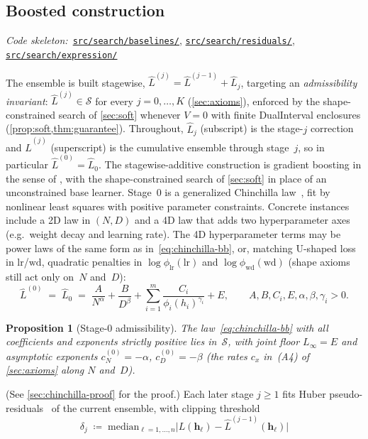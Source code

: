 \documentclass[11pt]{article}
\newcommand{\calS}{\mathcal{S}}
\newcommand{\Lhat}{\hat{L}}
\newcommand{\repoTree}{https://github.com/krichelj/ByteBoost-Shape-Constrained-Boosted-SR/tree/main/}
\newcommand{\pyDir}[1]{\href{\repoTree#1}{\nolinkurl{#1/}}}
\newcommand{\codeRef}[1]{%
  \par\nobreak\noindent
  {\footnotesize\textit{Code skeleton:}~#1}\par\smallskip}
\theoremstyle{plain}
\newtheorem{proposition}{Proposition}
\theoremstyle{remark}
\begin{document}
\subsection{Boosted construction}\label{sec:boosting}
\codeRef{\pyDir{src/search/baselines}, \pyDir{src/search/residuals}, \pyDir{src/search/expression}}
The ensemble is built stagewise,
$\Lhat^{(j)} = \Lhat^{(j-1)} + \Lhat_j$, targeting an \emph{admissibility invariant}:
$\Lhat^{(j)} \in \calS$ for every $j = 0, \ldots, K$ (\cref{sec:axioms}),
enforced by the shape-constrained search of \cref{sec:soft} whenever $V=0$ with finite DualInterval enclosures (\cref{prop:soft,thm:guarantee}).
Throughout, $\Lhat_j$ (subscript) is the stage-$j$ correction and
$\Lhat^{(j)}$ (superscript) is the cumulative ensemble through stage~$j$,
so in particular $\Lhat^{(0)} = \Lhat_0$.
The stagewise-additive construction is gradient boosting in the sense of \citet{friedman2001greedy}, with the shape-constrained search of \cref{sec:soft} in place of an unconstrained base learner.
Stage~$0$ is a generalized Chinchilla law~\citep{hoffmann2022chinchilla}, fit by nonlinear least squares with
positive parameter constraints.
Concrete instances include a 2D law in $(N,D)$ and a 4D law that adds two
hyperparameter axes (e.g.\ weight decay and learning rate). The 4D hyperparameter
terms may be power laws of the same form as in~\eqref{eq:chinchilla-bb}, or, matching
U-shaped loss in $\mathrm{lr}$/$\mathrm{wd}$, quadratic penalties in
$\log\phi_{\mathrm{lr}}(\mathrm{lr})$ and $\log\phi_{\mathrm{wd}}(\mathrm{wd})$
(shape axioms still act only on~$N$ and~$D$):
\begin{equation}\label{eq:chinchilla-bb}
    \Lhat^{(0)} \;=\; \Lhat_0 \;=\;
    \frac{A}{N^{\alpha}} + \frac{B}{D^{\beta}}
    + \sum_{i=1}^{m} \frac{C_i}{\phi_i(h_i)^{\gamma_i}} + E,
    \qquad A, B, C_i, E, \alpha, \beta, \gamma_i > 0 .
\end{equation}
\begin{proposition}[Stage-0 admissibility]\label{prop:chinchilla-admiss}
The law~\eqref{eq:chinchilla-bb} with all coefficients and exponents strictly positive
lies in~$\calS$, with joint floor $L_\infty = E$ and asymptotic exponents
$c_N^{(0)} = -\alpha$, $c_D^{(0)} = -\beta$ (the rates $c_x$ in~(A4) of \cref{sec:axioms} along $N$ and~$D$).
\end{proposition}
(See \cref{sec:chinchilla-proof} for the proof.)
Each later stage $j \geq 1$ fits Huber pseudo-residuals~\citep{huber1964robust,friedman2001greedy} of the current ensemble,
with clipping threshold
\begin{equation}\label{eq:delta-bb}
    \delta_j
    \;\coloneqq\;
    \mathrm{median}_{\ell=1,\ldots,n}
    \bigl|L(\mathbf{h}_\ell) - \Lhat^{(j-1)}(\mathbf{h}_\ell)\bigr|
\end{equation}
\end{document}
